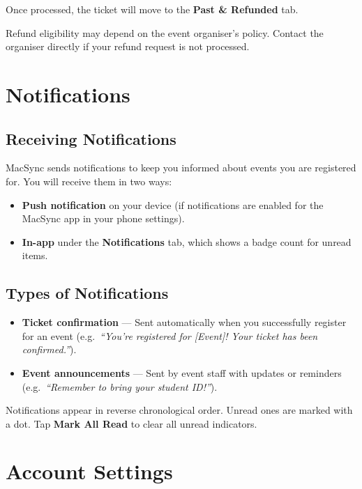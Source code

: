 \documentclass[12pt, twoside]{report}
\newcommand{\uielem}[1]{\textbf{#1}}
\begin{document}
Once processed, the ticket will move to the \uielem{Past \& Refunded} tab.

\begin{warnbox}
Refund eligibility may depend on the event organiser's policy. Contact the
organiser directly if your refund request is not processed.
\end{warnbox}


\chapter{Notifications}

\section{Receiving Notifications}

MacSync sends notifications to keep you informed about events you are
registered for. You will receive them in two ways:

\begin{itemize}
  \item \textbf{Push notification} on your device (if notifications are
        enabled for the MacSync app in your phone settings).
  \item \textbf{In-app} under the \uielem{Notifications} tab, which shows
        a badge count for unread items.
\end{itemize}

\section{Types of Notifications}

\begin{itemize}
  \item \textbf{Ticket confirmation} --- Sent automatically when you
        successfully register for an event
        (e.g.\ \textit{``You're registered for [Event]! Your ticket has
        been confirmed.''}).
  \item \textbf{Event announcements} --- Sent by event staff with updates
        or reminders (e.g.\ \textit{``Remember to bring your student ID!''}).
\end{itemize}

Notifications appear in reverse chronological order. Unread ones are marked
with a dot. Tap \uielem{Mark All Read} to clear all unread indicators.


\chapter{Account Settings}
\end{document}
